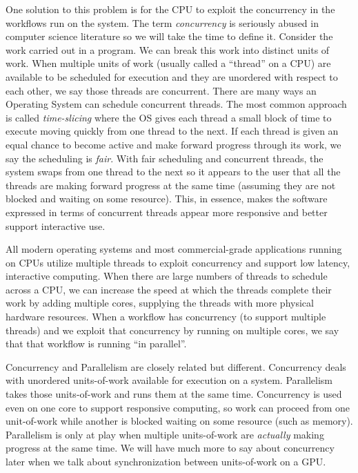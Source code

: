 One solution to this problem is for the CPU to exploit the concurrency in the workflows run on the system.
The term \emph{concurrency} is seriously abused in computer science literature so we will
take the time to define it.   Consider the work carried out in a program.   We can break this work into 
distinct units of work.  When multiple units of work (usually called a ``thread'' on a CPU) are 
available to be scheduled for execution and they are unordered with respect to each other, we say those threads are concurrent.  
There are many ways an Operating System can schedule concurrent threads.  
The most common approach is called \emph{time-slicing} where the OS gives
each thread a small block of time to execute moving quickly from one thread to the next.  
If each thread is given an equal chance
to become active and make forward progress through its work, we say the scheduling is \emph{fair}.  With fair scheduling
and concurrent threads, the system swaps from one thread to the next so it appears to the user that all the threads
are making forward progress at the same time (assuming they are not blocked and waiting on some resource).   This, in essence, makes the
software expressed in terms of concurrent threads appear more responsive and better support interactive use.

All modern operating systems and most commercial-grade applications running on CPUs utilize multiple threads to
exploit concurrency and support low latency, interactive computing.  When there are large numbers
of threads to schedule across a CPU, we can increase the speed at which the threads complete their work by adding multiple 
cores, supplying the threads with more physical hardware resources.  When a workflow has concurrency (to support multiple threads) and we exploit that concurrency by running on 
multiple cores, we say that that workflow is running ``in parallel''.  

Concurrency and Parallelism are closely related but 
different.  Concurrency deals with unordered units-of-work available for execution on a system.  Parallelism takes those  
units-of-work and runs them at the same time.  Concurrency is used even on one core to support 
responsive computing, so work can proceed from one unit-of-work while another is blocked waiting on some resource (such as 
memory).  Parallelism is only at play when multiple units-of-work are \emph{actually} making progress at the same time.  We will have 
much more to say about concurrency later when we talk about synchronization between units-of-work on a GPU.

